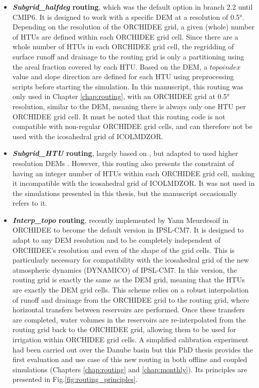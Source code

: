 \begin{itemize}
\item \textbf{\textit{Subgrid\_halfdeg} routing}, which was the default option in branch 2.2 until CMIP6. It is designed to work with a specific DEM at a resolution of 0.5°.
Depending on the resolution of the ORCHIDEE grid, a given (whole) number of HTUs are defined within each ORCHIDEE grid cell. Since there are a whole number of HTUs in each ORCHIDEE grid cell, the regridding of surface runoff and drainage to the routing grid is only a partitioning using the areal fraction covered by each HTU.
Based on the DEM, a $topoindex$ value and slope direction are defined for each HTU using preprocessing scripts before starting the simulation.
In this manuscript, this routing was only used in Chapter \ref{chap:routing},  with an ORCHIDEE grid at 0.5° resolution, similar to the DEM, meaning there is always only one HTU per ORCHIDEE grid cell. 
It must be noted that this routing code is not compatible with non-regular ORCHIDEE grid cells, and can therefore not be used with the icosahedral grid of ICOLMDZOR.

\item \textbf{\textit{Subgrid\_HTU} routing}, largely based on \std, but adapted to used higher resolution DEMs \citep{nguyen-quang_orchidee-routing_2018, polcher_hydrological_2023}. However, this routing  also presents the constraint of having an integer number of HTUs within each ORCHIDEE grid cell, making it incompatible with the icosahedral grid of ICOLMDZOR. It was not used in the simulations presented in this thesis, but the manuscript occasionally refers to it.

\item \textbf{\textit{Interp\_topo} routing}, recently implemented by Yann Meurdesoif in ORCHIDEE to become the default version in IPSL-CM7. 
It is designed to adapt to any DEM resolution and to be completely independent of ORCHIDEE’s resolution and even of the shape of the grid cells. This is particularly necessary for compatibility with the icosahedral grid of the new atmospheric dynamics (DYNAMICO) of IPSL-CM7.
In this version, the routing grid is exactly the same as the DEM grid, meaning that the HTUs are exactly the DEM grid cells. This scheme relies on a robust interpolation \citep{kritsikis_conservative_2017} of runoff and drainage from the ORCHIDEE grid to the routing grid, where horizontal transfers between reservoirs are performed. Once these transfers are completed, water volumes in the reservoirs are re-interpolated from the routing grid back to the ORCHIDEE grid, allowing them to be used for irrigation within ORCHIDEE grid cells. 
A simplified calibration experiment had been carried out over the Danube basin \citep{kilic_evaluation_2023} but this PhD thesis provides the first evaluation and use case of this new routing in both offline and coupled simulations (Chapters \ref{chap:routing} and \ref{chap:monthly}).
Its principles are presented in Fig.\ref{fig:routing_principles}.
\end{itemize}


